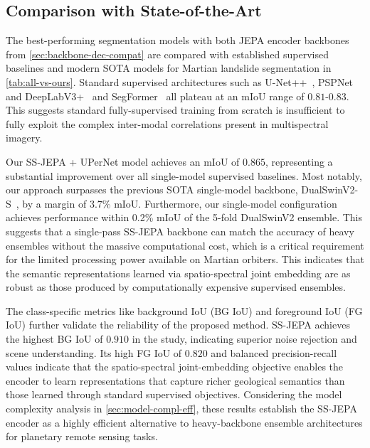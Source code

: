 \subsection{Comparison with State-of-the-Art}
\label{sec:comp-sota}

The best-performing segmentation models with both JEPA encoder backbones from \cref{sec:backbone-dec-compat} are compared with established supervised baselines and modern SOTA models for Martian landslide segmentation in \cref{tab:all-vs-ours}. Standard supervised architectures such as U-Net++~\cite{zhou2019unetplusplus}, PSPNet~\cite{zhao2017pyramidsceneparsingnetwork} and DeepLabV3+~\cite{DBLP:journals/corr/abs-1802-02611} and SegFormer~\cite{xie2021segformer} all plateau at an mIoU range of $0.81$-$0.83$. This suggests standard fully-supervised training from scratch is insufficient to fully exploit the complex inter-modal correlations present in multispectral imagery.

Our SS-JEPA + UPerNet model achieves an mIoU of $0.865$, representing a substantial improvement over all single-model supervised baselines. Most notably, our approach surpasses the previous SOTA single-model backbone, DualSwinV2-S~\cite{kabir2026dualswinfusionsegmultimodalmartianlandslide}, by a margin of $3.7\%$ mIoU. Furthermore, our single-model configuration achieves performance within 0.2\% mIoU of the 5-fold DualSwinV2 ensemble. This suggests that a single-pass SS-JEPA backbone can match the accuracy of heavy ensembles without the massive computational cost, which is a critical requirement for the limited processing power available on Martian orbiters. This indicates that the semantic representations learned via spatio-spectral joint embedding are as robust as those produced by computationally expensive supervised ensembles.

The class-specific metrics like background IoU (BG IoU) and foreground IoU (FG IoU) further validate the reliability of the proposed method. SS-JEPA achieves the highest BG IoU of $0.910$ in the study, indicating superior noise rejection and scene understanding. Its high FG IoU of $0.820$ and balanced precision-recall values indicate that the spatio-spectral joint-embedding objective enables the encoder to learn representations that capture richer geological semantics than those learned through standard supervised objectives. Considering the model complexity analysis in \cref{sec:model-compl-eff}, these results establish the SS-JEPA encoder as a highly efficient alternative to heavy-backbone ensemble architectures for planetary remote sensing tasks.



